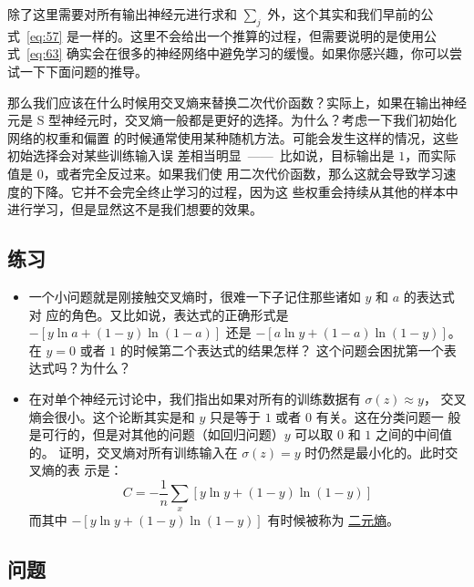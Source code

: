 除了这里需要对所有输出神经元进行求和 $\sum_j$ 外，这个其实和我们早前的公
式~\eqref{eq:57} 是一样的。这里不会给出一个推算的过程，但需要说明的是使用公
式~\eqref{eq:63} 确实会在很多的神经网络中避免学习的缓慢。如果你感兴趣，你可以尝
试一下下面问题的推导。

那么我们应该在什么时候用交叉熵来替换二次代价函数？实际上，如果在输出神经元是 S
型神经元时，交叉熵一般都是更好的选择。为什么？考虑一下我们初始化网络的权重和偏置
的时候通常使用某种随机方法。可能会发生这样的情况，这些初始选择会对某些训练输入误
差相当明显~——~比如说，目标输出是 $1$，而实际值是 $0$，或者完全反过来。如果我们使
用二次代价函数，那么这就会导致学习速度的下降。它并不会完全终止学习的过程，因为这
些权重会持续从其他的样本中进行学习，但是显然这不是我们想要的效果。

\subsection*{练习}

\begin{itemize}
\item 一个小问题就是刚接触交叉熵时，很难一下子记住那些诸如 $y$ 和 $a$ 的表达式对
  应的角色。又比如说，表达式的正确形式是 $-[y \ln a + (1-y) \ln (1-a)]$ 还是
  $-[a \ln y + (1-a) \ln (1-y)]$。在 $y=0$ 或者 $1$ 的时候第二个表达式的结果怎样？
  这个问题会困扰第一个表达式吗？为什么？
\item 在对单个神经元讨论中，我们指出如果对所有的训练数据有 $\sigma(z) \approx y$，
  交叉熵会很小。这个论断其实是和 $y$ 只是等于 $1$ 或者 $0$ 有关。这在分类问题一
  般是可行的，但是对其他的问题（如回归问题）$y$ 可以取 $0$ 和 $1$ 之间的中间值的。
  证明，交叉熵对所有训练输入在 $\sigma(z) = y$ 时仍然是最小化的。此时交叉熵的表
  示是：
  \begin{equation}
    C = -\frac{1}{n} \sum_x [y \ln y+(1-y) \ln(1-y)]
    \label{eq:64}\tag{64}
  \end{equation}
  而其中 $-[y \ln y+(1-y)\ln(1-y)]$ 有时候被称为%
  \href{http://en.wikipedia.org/wiki/Binary_entropy_function}{二元熵}。
\end{itemize}

\subsection*{问题}

